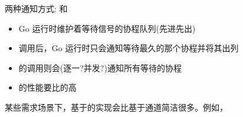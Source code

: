 \begin{frame}{两种通知方式: 和}
   \begin{itemize}
       \item Go 运行时维护着等待信号的协程队列(先进先出)
       \item {}调用后，Go 运行时只会通知等待最久的那个协程并将其出列
       \item {}的调用则会(逐一?并发?)通知所有等待的协程
       \item \Cond 的性能要比\channel 的高
   \end{itemize} 

   某些需求场景下，基于\Cond 的实现会比基于通道\channel 简洁很多。例如，
\end{frame}